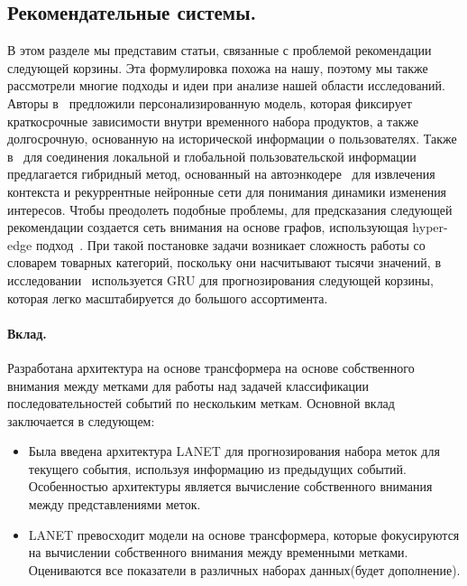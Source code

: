 \documentclass[a4paper, 12pt]{article} %
\begin{document}
\subsection{Рекомендательные системы.}
В этом разделе мы представим статьи, связанные с проблемой рекомендации следующей корзины. Эта формулировка похожа на нашу, поэтому мы также рассмотрели многие подходы и идеи при анализе нашей области исследований. Авторы в~\cite{ariannezhad2023personalized} предложили персонализированную модель, которая фиксирует краткосрочные зависимости внутри временного набора продуктов, а также долгосрочную, основанную на исторической информации о пользователях. Также в~\cite{yannam2023hybrid} для соединения локальной и глобальной пользовательской информации предлагается гибридный метод, основанный на автоэнкодере~\cite{liou2014autoencoder} для извлечения контекста и рекуррентные нейронные сети для понимания динамики изменения интересов. Чтобы преодолеть подобные проблемы, для предсказания следующей рекомендации создается сеть внимания на основе графов, использующая hyper-edge подход~\cite{song2023hgat}.
При такой постановке задачи возникает сложность работы со словарем товарных категорий, поскольку они насчитывают тысячи значений, в исследовании~\cite{van2023next} используется GRU для прогнозирования следующей корзины, которая легко масштабируется до большого ассортимента.


\paragraph{\textbf{Вклад.}}
Разработана архитектура на основе трансформера на основе собственного внимания между метками для работы над задачей классификации последовательностей событий по нескольким меткам. Основной вклад заключается в следующем:
\begin{itemize}
    \item Была введена архитектура LANET для прогнозирования набора меток для текущего события, используя информацию из предыдущих событий. Особенностью архитектуры является вычисление собственного внимания между представлениями меток.  
    \item LANET превосходит модели на основе трансформера, которые фокусируются на вычислении собственного внимания между временными метками. Оцениваются все показатели в различных наборах данных(будет дополнение).
\end{itemize}
\end{document}

